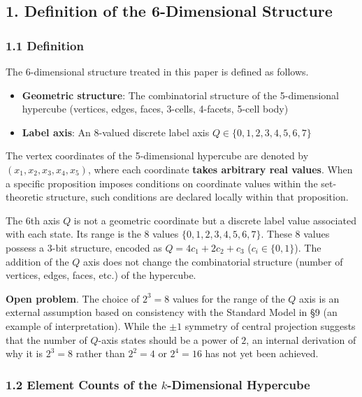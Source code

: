 \documentclass[
  a4paper,11pt]{article}
\providecommand{\tightlist}{%
  \setlength{\itemsep}{0pt}\setlength{\parskip}{0pt}}
\theoremstyle{definition}
\theoremstyle{remark}
\begin{document}
\subsection{1. Definition of the 6-Dimensional
Structure}\label{definition-of-the-6-dimensional-structure}

\subsubsection{1.1 Definition}\label{definition}

The 6-dimensional structure treated in this paper is defined as follows.

\begin{itemize}
\tightlist
\item
  \textbf{Geometric structure}: The combinatorial structure of the
  5-dimensional hypercube (vertices, edges, faces, 3-cells, 4-facets,
  5-cell body)
\item
  \textbf{Label axis}: An 8-valued discrete label axis
  \(Q \in \{0, 1, 2, 3, 4, 5, 6, 7\}\)
\end{itemize}

The vertex coordinates of the 5-dimensional hypercube are denoted by
\((x_1, x_2, x_3, x_4, x_5)\), where each coordinate \textbf{takes
arbitrary real values}. When a specific proposition imposes conditions
on coordinate values within the set-theoretic structure, such conditions
are declared locally within that proposition.

The 6th axis \(Q\) is not a geometric coordinate but a discrete label
value associated with each state. Its range is the 8 values
\(\{0, 1, 2, 3, 4, 5, 6, 7\}\). These 8 values possess a 3-bit
structure, encoded as \(Q = 4c_1 + 2c_2 + c_3\) (\(c_i \in \{0, 1\}\)).
The addition of the \(Q\) axis does not change the combinatorial
structure (number of vertices, edges, faces, etc.) of the hypercube.

\textbf{Open problem}. The choice of \(2^3 = 8\) values for the range of
the \(Q\) axis is an external assumption based on consistency with the
Standard Model in §9 (an example of interpretation). While the \(\pm 1\)
symmetry of central projection suggests that the number of \(Q\)-axis
states should be a power of \(2\), an internal derivation of why it is
\(2^3 = 8\) rather than \(2^2 = 4\) or \(2^4 = 16\) has not yet been
achieved.

\subsubsection{\texorpdfstring{1.2 Element Counts of the
\(k\)-Dimensional
Hypercube}{1.2 Element Counts of the k-Dimensional Hypercube}}\label{element-counts-of-the-k-dimensional-hypercube}
\end{document}
